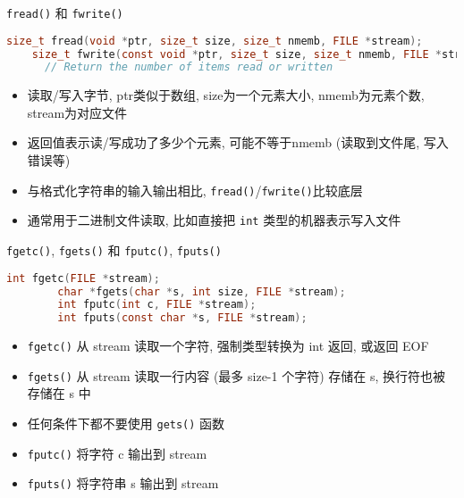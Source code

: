 \begin{frame}[fragile]{\texttt{fread()} 和 \texttt{fwrite()}}
    \scriptsize
    \begin{lstlisting}[language=c]
    size_t fread(void *ptr, size_t size, size_t nmemb, FILE *stream);
    size_t fwrite(const void *ptr, size_t size, size_t nmemb, FILE *stream);
      // Return the number of items read or written
    \end{lstlisting}
    \small
    \begin{itemize}[<+- | alert@+>]
        \item 读取/写入字节, ptr类似于数组, size为一个元素大小, nmemb为元素个数, stream为对应文件
        \item 返回值表示读/写成功了多少个元素, 可能不等于nmemb (读取到文件尾, 写入错误等)
        \item 与格式化字符串的输入输出相比, \texttt{fread()}/\texttt{fwrite()}比较底层
        \item 通常用于二进制文件读取, 比如直接把 \texttt{int} 类型的机器表示写入文件
    \end{itemize}
\end{frame}

\begin{frame}[fragile]{\texttt{fgetc()}, \texttt{fgets()} 和 \texttt{fputc()}, \texttt{fputs()}}
    \scriptsize
    \begin{lstlisting}[language=c]
        int fgetc(FILE *stream);
        char *fgets(char *s, int size, FILE *stream);
        int fputc(int c, FILE *stream);
        int fputs(const char *s, FILE *stream);
    \end{lstlisting}
    \small
    \begin{itemize}[<+- | alert@+>]
        \item \texttt{fgetc()} 从 stream 读取一个字符, 强制类型转换为 int 返回, 或返回 EOF
        \item \texttt{fgets()} 从 stream 读取一行内容 (最多 size-1 个字符) 存储在 s, 换行符也被存储在 s 中
        \item 任何条件下都不要使用 \texttt{gets()} 函数
        \item \texttt{fputc()} 将字符 c 输出到 stream
        \item \texttt{fputs()} 将字符串 s 输出到 stream
    \end{itemize}
\end{frame}

